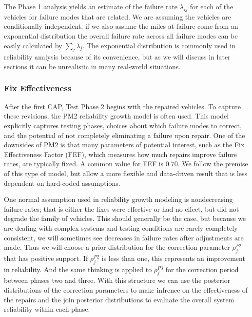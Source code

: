 \documentclass[12pt]{article}
\begin{document}
The Phase 1 analysis yields an estimate of the failure rate $\lambda_{ij}$ for
each of the vehicles for failure modes that are related.  We are assuming the
vehicles are conditionally independent, if we also assume the miles at failure
come from an exponential distribution the overall failure rate across all
failure modes can be easily calculated by $\sum_{j}\lambda_{j}$.  The
exponential distribution is commonly used in reliability analysis because of its
convenience, but as we will discuss in later sections it can be unrealistic in
many real-world situations.

\subsubsection{Fix Effectiveness}
After the first CAP, Test Phase 2 begins with the repaired vehicles. To capture
these revisions, the PM2 reliability growth model \cite{EH06} is often used.
This model explicitly captures testing phases, choices about which failure modes
to correct, and the potential of not completely eliminating a failure upon
repair. One of the downsides of PM2 is that many parameters of potential
interest, such as the Fix Effectiveness Factor (FEF), which measures how much
repairs improve failure rates, are typically fixed. A common value for FEF is
0.70. We follow the premise of this type of model, but allow a more flexible and
data-driven result that is less dependent on hard-coded assumptions.

One normal assumption used in reliability growth modeling is nondecreasing
failure rates; that is either the fixes were effective or had no effect, but did
not degrade the family of vehicles.  This should generally be the case, but
because we are dealing with complex systems and testing conditions are rarely
completely consistent, we will sometimes see decreases in failure rates after
adjustments are made.  Thus we will choose a prior distribution for the
correction parameter $\rho_{j}^{P2}$ that has positive support.  If
$\rho_{j}^{P2}$ is less than one, this represents an improvement in reliability.
And the same thinking is applied to $\rho_{j}^{P3}$ for the correction period
between phases two and three.  With this structure we can use the posterior
distributions of the correction parameters to make infrence on the effectiveness
of the repairs and the join posterior distributions to evaluate the overall
system reliability within each phase.
\end{document}
